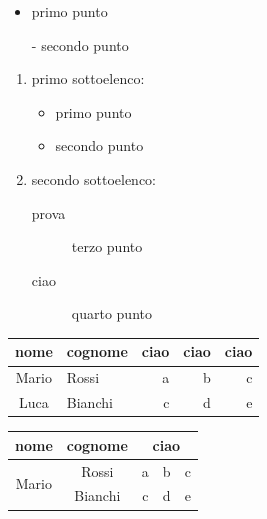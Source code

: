 \documentclass[a4paper, 12pt]{article} %
\begin{document}
\noindent
\begin{itemize}
    \item primo punto
    \item[-] secondo punto
\end{itemize}

\vspace{2cm}

\begin{enumerate}
    \item primo sottoelenco:
    \begin{itemize}
        \item primo punto
        \item secondo punto
    \end{itemize}
    \item secondo sottoelenco:
    \begin{description}
        \item[prova] terzo punto
        \item[ciao] quarto punto
    \end{description}
\end{enumerate}

\begin{flushleft}
\lipsum[1]    
\end{flushleft}

\begin{flushright}
\lipsum[1]    
\end{flushright}

\begin{center}
\lipsum[1]
\end{center}

\begin{center}
\begin{tabular}{|c|l|rrr}
\hline
nome & cognome & ciao & ciao & ciao \\
\hline
Mario & Rossi & a & b & c \\
Luca & Bianchi & c & d & e \\
\hline
\end{tabular}
\end{center}

\begin{center} %
{\renewcommand{\arraystretch}{1.5}\renewcommand{\tabcolsep}{0.5cm}
\begin{tabular}{|c|c|c|c|c|}
\hline
nome & cognome & \multicolumn{3}{|c|}{ciao} \\
\hline
\multirow{2}{*}{Mario} & Rossi & a & b & c \\ \cline{3-5}
& Bianchi & c & d & e \\
\hline
\end{tabular}
}
\end{center}
\end{document}
